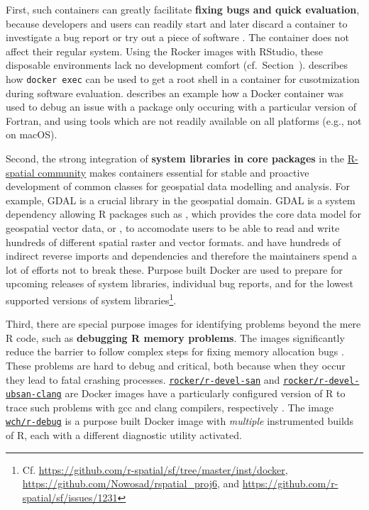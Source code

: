 First, such containers can greatly facilitate \textbf{fixing bugs and
quick evaluation}, because developers and users can readily start and
later discard a container to investigate a bug report or try out a piece
of software \citep[cf.][]{ooms_opencpu_2017}. The container does not
affect their regular system. Using the Rocker images with RStudio, these
disposable environments lack no development comfort
(cf.~Section~). \citet{ooms_opencpu_2017} describes
how \texttt{docker\ exec} can be used to get a root shell in a container
for cusotmization during software evaluation.
\citet{eddelbuettel_debugging_2019} describes an example how a Docker
container was used to debug an issue with a package only occuring with a
particular version of Fortran, and using tools which are not readily
available on all platforms (e.g., not on macOS).

Second, the strong integration of \textbf{system libraries in core
packages} in the \href{https://www.r-spatial.org/}{R-spatial community}
makes containers essential for stable and proactive development of
common classes for geospatial data modelling and analysis. For example,
GDAL \citep{gdal_2019} is a crucial library in the geospatial domain.
GDAL is a system dependency allowing R packages such as ,
which provides the core data model for geospatial vector data, or
, to accomodate users to be able to read and write
hundreds of different spatial raster and vector formats. 
and  have hundreds of indirect reverse imports and
dependencies and therefore the maintainers spend a lot of efforts not to
break these. Purpose built Docker are used to prepare for upcoming
releases of system libraries, individual bug reports, and for the lowest
supported versions of system
libraries\footnote{Cf. \href{https://github.com/r-spatial/sf/tree/master/inst/docker}{https://github.com/r-spatial/sf/tree/master/inst/docker}, \href{https://github.com/Nowosad/rspatial_proj6}{https://github.com/Nowosad/rspatial\_proj6}, and \href{https://github.com/r-spatial/sf/issues/1231}{https://github.com/r-spatial/sf/issues/1231}}.

Third, there are special purpose images for identifying problems beyond
the mere R code, such as \textbf{debugging R memory problems}. The
images significantly reduce the barrier to follow complex steps for
fixing memory allocation bugs
\citep[cf. Section~4.3 in][]{core_writing_1999}. These problems are hard
to debug and critical, both because when they occur they lead to fatal
crashing processes.
\href{https://github.com/rocker-org/r-devel-san}{\texttt{rocker/r-devel-san}}
and
\href{https://github.com/rocker-org/r-devel-san-clang}{\texttt{rocker/r-devel-ubsan-clang}}
are Docker images have a particularly configured version of R to trace
such problems with gcc and clang compilers, respectively
\citep[cf.~ for examples,][]{eddelbuettel_sanitizers_2014}.
The image \href{https://github.com/wch/r-debug}{\texttt{wch/r-debug}} is
a purpose built Docker image with \emph{multiple} instrumented builds of
R, each with a different diagnostic utility activated.


